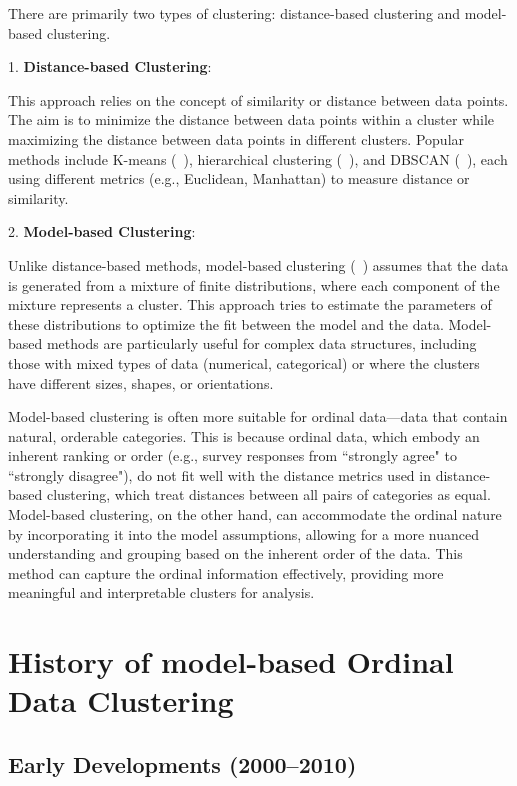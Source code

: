 \documentclass{article}
\begin{document}
There are primarily two types of clustering: distance-based clustering and model-based clustering.

1. \textbf{Distance-based Clustering}: 

This approach relies on the concept of similarity or distance between data points. 
The aim is to minimize the distance between data points within a cluster while maximizing the distance between data points in different clusters. 
Popular methods include K-means (~\cite{macqueen1967some}), 
hierarchical clustering (~\cite{johnson1967hierarchical}), and DBSCAN (~\cite{ester1996density}), 
each using different metrics (e.g., Euclidean, Manhattan) to measure distance or similarity.

2. \textbf{Model-based Clustering}: 

Unlike distance-based methods, model-based clustering (~\cite{fraley2002model}) assumes that the data is generated from a mixture of finite distributions, 
where each component of the mixture represents a cluster. 
This approach tries to estimate the parameters of these distributions to optimize the fit between the model and the data. 
Model-based methods are particularly useful for complex data structures, including those with mixed types of data (numerical, categorical) or where the clusters have different sizes, shapes, or orientations.

Model-based clustering is often more suitable for ordinal data—data that contain natural, orderable categories. This is because ordinal data, which embody an inherent ranking or order (e.g., survey responses from ``strongly agree" to ``strongly disagree"), do not fit well with the distance metrics used in distance-based clustering, which treat distances between all pairs of categories as equal. Model-based clustering, on the other hand, can accommodate the ordinal nature by incorporating it into the model assumptions, allowing for a more nuanced understanding and grouping based on the inherent order of the data. This method can capture the ordinal information effectively, providing more meaningful and interpretable clusters for analysis.

\section{History of model-based Ordinal Data Clustering}

\subsection{Early Developments (2000--2010)}
\end{document}
